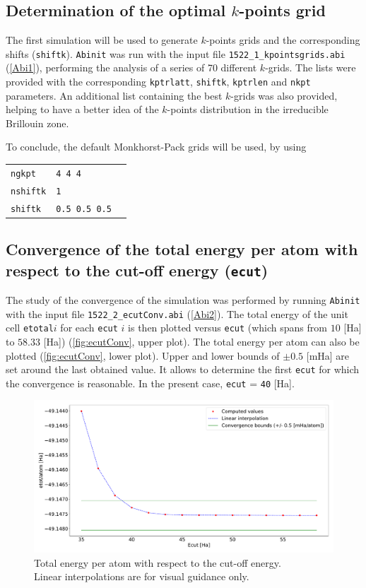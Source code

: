\documentclass[11pt,a4paper]{article}
\begin{document}
\subsection{Determination of the optimal $k$-points grid}
The first simulation will be used to generate $k$-points grids and the corresponding shifts (\texttt{shiftk}). \texttt{Abinit} was run with the input file \texttt{1522\_1\_kpointsgrids.abi} (\autoref{Abi1}), performing the analysis of a series of 70 different $k$-grids. The lists were provided with the corresponding \texttt{kptrlatt}, \texttt{shiftk}, \texttt{kptrlen} and \texttt{nkpt} parameters. An additional list containing the best $k$-grids was also provided, helping to have a better idea of the $k$-points distribution in the irreducible Brillouin zone.

To conclude, the default Monkhorst-Pack grids will be used, by using
\begin{center}
\begin{tabular}{lll}
\texttt{ngkpt} & \texttt{4 4 4}&\\
\texttt{nshiftk} & \texttt{1} &\\
\texttt{shiftk} &\texttt{0.5 0.5 0.5}
\end{tabular}
\end{center}
\subsection{Convergence of the total energy per atom with respect to the cut-off energy (\texttt{ecut})}
The study of the convergence of the simulation was performed by running \texttt{Abinit} with the input file \texttt{1522\_2\_ecutConv.abi} (\autoref{Abi2}).
The total energy of the unit cell \texttt{etotal}$i$ for each \texttt{ecut} $i$ is then plotted versus \texttt{ecut} (which spans from $10$ [Ha] to $58.33$ [Ha]) (\autoref{fig:ecutConv}, upper plot). The total energy per atom can also be plotted (\autoref{fig:ecutConv}, lower plot). Upper and lower bounds of $\pm 0.5$ [mHa] are set around the last obtained value. It allows to determine the first \texttt{ecut} for which the convergence is reasonable. In the present case, \texttt{ecut} = \texttt{40} [Ha].
\begin{figure}[H]
\includegraphics[width=\textwidth]{images/etotecut}
\caption{Total energy per atom with respect to the cut-off energy.\\
Linear interpolations are for visual guidance only.}
\label{fig:ecutConv}
\end{figure}
\end{document}
